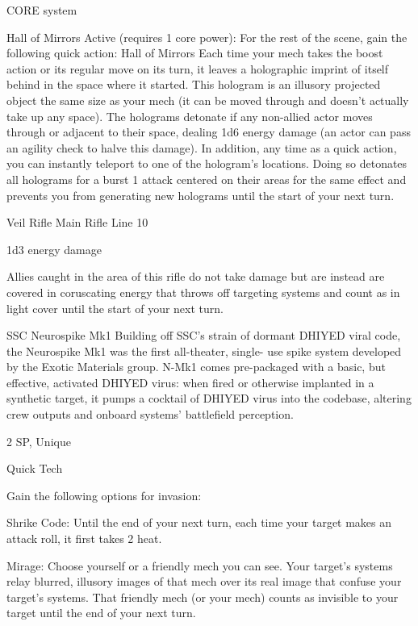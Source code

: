                                                   CORE system




                                                  Hall of Mirrors
  Active (requires 1 core power): For the rest of the scene, gain the following quick action:
  Hall of Mirrors
  Each time your mech takes the boost action or its regular move on its turn, it leaves a holographic
  imprint of itself behind in the space where it started. This hologram is an illusory projected object the
  same size as your mech (it can be moved through and doesn’t actually take up any space). The
  holograms detonate if any non-allied actor moves through or adjacent to their space, dealing 1d6
  energy damage (an actor can pass an agility check to halve this damage). In addition, any time as a
  quick action, you can instantly teleport to one of the hologram’s locations. Doing so detonates all
  holograms for a burst 1 attack centered on their areas for the same effect and prevents you from
  generating new holograms until the start of your next turn.

Veil Rifle
Main Rifle
Line 10

1d3 energy damage

Allies caught in the area of this rifle do not take damage but are instead are covered in
coruscating energy that throws off targeting systems and count as in light cover until the start of
your next turn.


SSC Neurospike Mk1
Building off SSC’s strain of dormant DHIYED viral code, the Neurospike Mk1 was the first all-theater, single-
use spike system developed by the Exotic Materials group. N-Mk1 comes pre-packaged with a basic, but
effective, activated DHIYED virus: when fired or otherwise implanted in a synthetic target, it pumps a
cocktail of DHIYED virus into the codebase, altering crew outputs and onboard systems’ battlefield
perception.

2 SP, Unique

Quick Tech

Gain the following options for invasion:

         Shrike Code: Until the end of your next turn, each time your target makes an attack roll,
         it first takes 2 heat.

         Mirage: Choose yourself or a friendly mech you can see. Your target’s systems relay
         blurred, illusory images of that mech over its real image that confuse your target’s
         systems. That friendly mech (or your mech) counts as invisible to your target until the end
         of your next turn.


